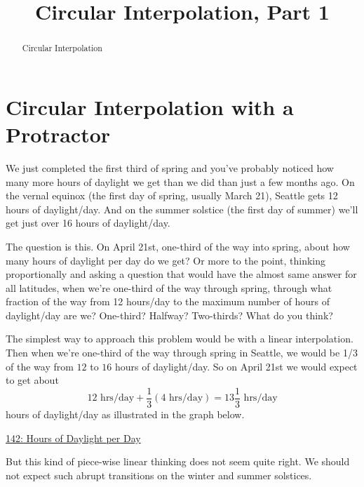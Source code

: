 \documentclass{ximera}
\title{Circular Interpolation, Part 1}
\begin{document}
\begin{abstract}
Circular Interpolation
\end{abstract}
\maketitle


\section{Circular Interpolation with a Protractor}

\begin{example}  \label{Ex:LLL}
We just completed the first third of spring and you've probably noticed how many more hours of daylight we get than we did than just a few months ago. On the vernal equinox (the first day of spring, usually March 21), Seattle gets 12 hours of daylight/day. And on the summer solstice (the first day of summer) we'll get just over 16 hours of daylight/day. 

The question is this. On April 21st, one-third of the way into spring, about how many hours of daylight per day do we get? Or more to the point, thinking proportionally and asking a question that would have the almost same answer for all latitudes, when we're one-third of the way through spring, through what fraction of the way from 12 hours/day to the maximum number of hours of daylight/day are we? One-third? Halfway? Two-thirds? What do you think?

The simplest way to approach this problem would be with a linear interpolation. Then when we're one-third of the way through spring in Seattle, we would be 1/3 of the way from $12$ to $16$ hours of daylight/day. So on April 21st we would expect to get about
\[
    12 \text{ hrs/day} + \frac{1}{3}(4 \text{ hrs/day}) = 13 \frac{1}{3}\text{ hrs/day}
\]
hours of daylight/day as illustrated in the graph below.


\begin{onlineOnly}
    \begin{center}
\end{center}
\end{onlineOnly}

\href{https://www.desmos.com/calculator/esj3yytaug}{142: Hours of Daylight per Day}

But this kind of piece-wise linear thinking does not seem quite right. We should not expect such abrupt transitions on the winter and summer solstices.


\end{example}
\end{document}
